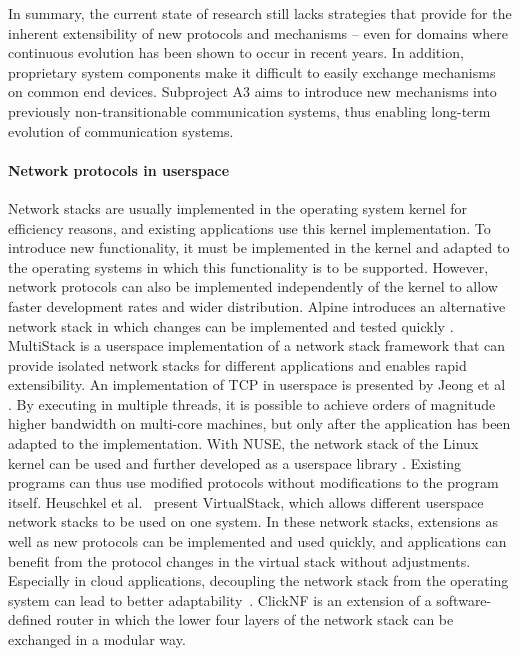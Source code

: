 In summary, the current state of research still lacks strategies that provide for the inherent extensibility of new protocols and mechanisms -- even for domains where continuous evolution has been shown to occur in recent years. In addition, proprietary system components make it difficult to easily exchange mechanisms on common end devices. Subproject A3 aims to introduce new mechanisms into previously non-transitionable communication systems, thus enabling long-term evolution of communication systems.


\paragraph{Network protocols in userspace}
Network stacks are usually implemented in the operating system kernel for efficiency reasons, and existing applications use this kernel implementation. 
To introduce new functionality, it must be implemented in the kernel and adapted to the operating systems in which this functionality is to be supported.
However, network protocols can also be implemented independently of the kernel to allow faster development rates and wider distribution. 
Alpine introduces an alternative network stack in which changes can be implemented and tested quickly \cite{A3:ely2001alpine}.
MultiStack \cite{A3:honda2014rekindling} is a userspace implementation of a network stack framework that can provide isolated network stacks for different applications and enables rapid extensibility. 
An implementation of TCP in userspace is presented by Jeong et al \cite{A3:jeong2014mtcp}.
By executing in multiple threads, it is possible to achieve orders of magnitude higher bandwidth on multi-core machines, but only after the application has been adapted to the implementation.
With NUSE, the network stack of the Linux kernel can be used and further developed as a userspace library \cite{A3:tazaki2015library}. 
Existing programs can thus use modified protocols without modifications to the program itself.
Heuschkel et al.~\cite{A3:heuschkel2016virtualstack} present VirtualStack, which allows different userspace network stacks to be used on one system. 
In these network stacks, extensions as well as new protocols can be implemented and used quickly, and applications can benefit from the protocol changes in the virtual stack without adjustments. 
Especially in cloud applications, decoupling the network stack from the operating system can lead to better adaptability~\cite{A3:niu2017network}.
ClickNF \cite{A3:gallo2018clicknf} is an extension of a software-defined router in which the lower four layers of the network stack can be exchanged in a modular way. 
